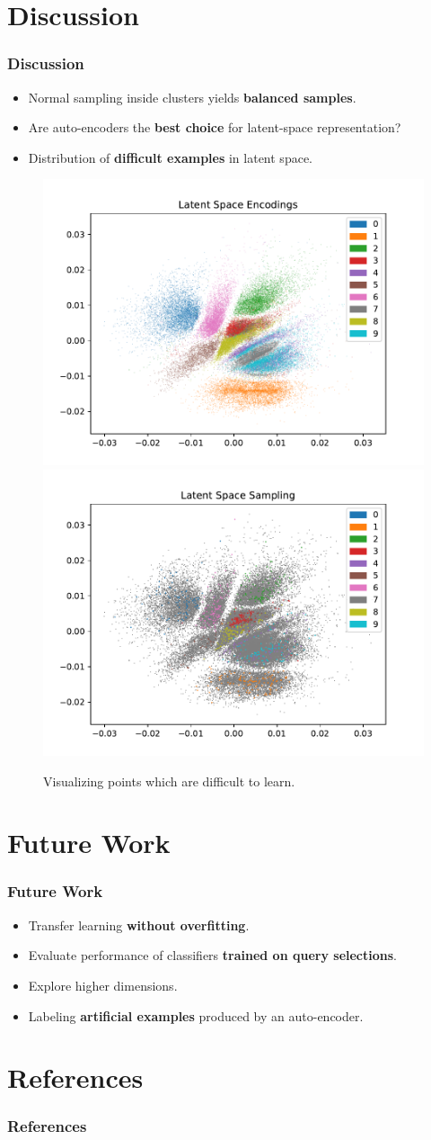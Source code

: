 \documentclass[10pt, usenames, dvipsnames, table]{beamer}
\begin{document}
\section{Discussion}
\begin{frame}
  \frametitle{Discussion}
  \begin{itemize}
  \item Normal sampling inside clusters yields \textbf{balanced samples}. \pause{}
  \item Are auto-encoders the \textbf{best choice} for latent-space
    representation?\pause{}
  \item Distribution of \textbf{difficult examples} in latent space.
  \end{itemize}
  \pause
  \begin{figure}
    \centering
    \includegraphics[width=0.49\linewidth]
    {models/mnist_student_e300_L2_b64/encodings}
    \includegraphics[width=0.49\linewidth]
    {models/mnist_student_e300_L2_b64/classifier-loss_sampling_1000}
    \caption{Visualizing points which are difficult to learn.}
    \label{}
  \end{figure}
\end{frame}

\section{Future Work}
\begin{frame}
  \frametitle{Future Work}
  \begin{itemize}
  \item<1-> Transfer learning \textbf{without overfitting}.
  \item<2-> Evaluate performance of classifiers \textbf{trained on query
      selections}.
  \item<3-> Explore higher dimensions.
  \item<4-> Labeling \textbf{artificial examples} produced by an auto-encoder.
  \end{itemize}
\end{frame}

\section{References}
\label{sec:references}

\begin{frame}[t, allowframebreaks]
  \frametitle{References}
  \tiny
  
  
\end{frame}
\end{document}

